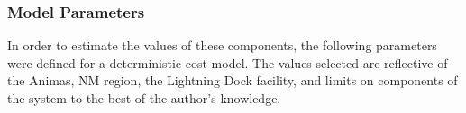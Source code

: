 \subsubsection{Model Parameters}

In order to estimate the values of these components, the following parameters were defined for a deterministic cost model. The values selected are reflective of the Animas, NM region, the Lightning Dock facility, and limits on components of the system to the best of the author's knowledge.

